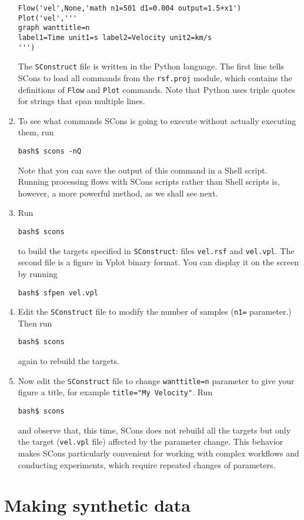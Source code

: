 \begin{enumerate}
\begin{lstlisting}[frame=single]
Flow('vel',None,'math n1=501 d1=0.004 output=1.5+x1')
Plot('vel','''
graph wanttitle=n 
label1=Time unit1=s label2=Velocity unit2=km/s
''')
\end{lstlisting}
The \texttt{SConstruct} file is written in the Python language.
The first line tells SCons to load all commands from the \texttt{rsf.proj} module, which contains the definitions of \texttt{Flow} and \texttt{Plot} commands. Note that Python uses triple quotes for strings that span multiple lines.
\item To see what commands SCons is going to execute without actually executing them, run
\begin{verbatim}
bash$ scons -nQ
\end{verbatim}
Note that you can save the output of this command in a Shell script. Running processing flows with SCons scripts rather than Shell scripts is, however, a more powerful method, as we shall see next.
\item Run 
\begin{verbatim}
bash$ scons
\end{verbatim}
to build the targets specified in \texttt{SConstruct}: files \texttt{vel.rsf} and \texttt{vel.vpl}. The second file is a figure in Vplot binary format. You can display it on the screen by running
\begin{verbatim}
bash$ sfpen vel.vpl
\end{verbatim}
\item Edit the \texttt{SConstruct} file to modify the number of samples (\texttt{n1=}  parameter.) Then run 
\begin{verbatim}
bash$ scons
\end{verbatim}
again to rebuild the targets.
\item Now edit the \texttt{SConstruct} file to change \texttt{wanttitle=n} parameter to give your figure a title, for example \texttt{title="My Velocity"}. Run 
\begin{verbatim}
bash$ scons
\end{verbatim}
and observe that, this time, SCons does not rebuild all the targets but only the target (\texttt{vel.vpl} file) affected by the parameter change. This behavior makes SCons particularly convenient for working with complex workflows and conducting experiments, which require repeated changes of parameters.
\end{enumerate}

\section{Making synthetic data}

